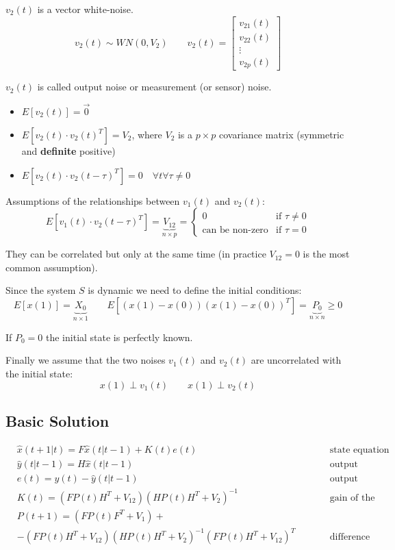 $v_2(t)$ is a vector white-noise.
\[
    v_2(t) \sim WN(0, V_2) \qquad v_2(t) = \begin{bmatrix}
        v_{21}(t) \\
        v_{22}(t) \\
        \vdots \\
        v_{2p}(t)
    \end{bmatrix}
\]

$v_2(t)$ is called output noise or measurement (or sensor) noise.
\begin{itemize}
    \item $E[v_2(t)] = \vec{0}$
    \item $E[v_2(t) \cdot v_2(t)^T] = V_2$, where $V_2$ is a $p\times p$ covariance matrix (symmetric and \textbf{definite} positive)
    \item $E[v_2(t) \cdot v_2(t-\tau)^T] = 0 \quad \forall t \forall \tau \ne 0$
\end{itemize}

Assumptions of the relationships between $v_1(t)$ and $v_2(t)$:
\[
    E[v_1(t) \cdot v_2(t-\tau)^T] = \underbrace{V_{12}}_{n\times p} = \begin{cases}
        0 & \text{if } \tau \ne 0 \\
        \text{can be non-zero} & \text{if } \tau = 0
    \end{cases}
\]

They can be correlated but only at the same time (in practice $V_{12}=0$ is the most common assumption).

Since the system $S$ is dynamic we need to define the initial conditions:
\[
    E[x(1)] = \underbrace{X_0}_{n\times 1} \qquad E[\left(x(1) - x(0)\right)\left(x(1)-x(0)\right)^T] = \underbrace{P_0}_{n\times n} \ge 0
\]

If $P_0 = 0$ the initial state is perfectly known.

Finally we assume that the two noises $v_1(t)$ and $v_2(t)$ are uncorrelated with the initial state:
\[
    x(1) \perp v_1(t) \qquad x(1) \perp v_2(t)
\]

\subsection{Basic Solution}

\begin{align*}
    & \hat{x}(t+1|t) = F\hat{x}(t|t-1) + K(t)e(t) && \qquad \text{state equation} \\
    & \hat{y}(t|t-1) = H\hat{x}(t|t-1) &&\qquad \text{output equation} \\
    & e(t) = y(t) - \hat{y}(t|t-1) &&\qquad \text{output prediction error} \\
    & K(t) = \left( FP(t)H^T+V_{12} \right) \left( HP(t)H^T+V_2 \right)^{-1} &&\qquad \text{gain of the K.F.} \\
    & P(t+1) = \left( FP(t)F^T + V_1 \right) + &&\\
    & - \left( FP(t)H^T + V_{12} \right)\left( HP(t)H^T + V_{2} \right)^{-1}\left( FP(t)H^T + V_{12} \right)^T && \qquad\text{difference Riccati equation}
\end{align*}

